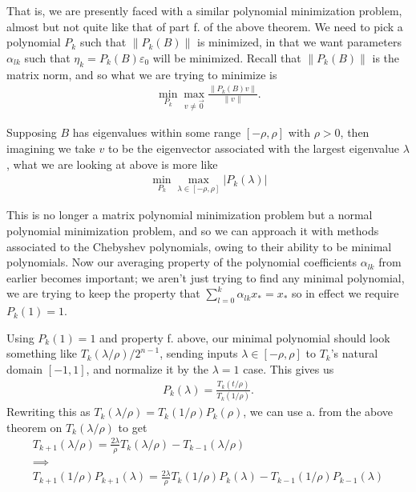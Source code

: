 \documentclass[11pt]{article}
\begin{document}
That is, we are presently faced with a similar polynomial minimization problem, almost but not quite like that of part f. of the above theorem. We need to pick a polynomial $P_k$ such that $\lVert P_k(B) \rVert$ is minimized, in that we want parameters $\alpha_{lk}$ such that $\eta_k = P_k(B) \varepsilon_0$ will be minimized. Recall that $\lVert P_k(B) \rVert$ is the matrix norm, and so what we are trying to minimize is \begin{gather*}
\min_{P_k} \max_{v \neq \vec 0} \frac{\lVert P_k(B) v \rVert }{\lVert v \rVert}.
\end{gather*}

Supposing $B$ has eigenvalues within some range $[-\rho,\rho]$ with $\rho > 0$, then imagining we take $v$ to be the eigenvector associated with the largest eigenvalue $\lambda$, what we are looking at above is more like \begin{gather*}
\min_{P_k} \max_{\lambda \in [-\rho,\rho]} \lvert P_k(\lambda) \rvert
\end{gather*}

This is no longer a matrix polynomial minimization problem but a normal polynomial minimization problem, and so we can approach it with methods associated to the Chebyshev polynomials, owing to their ability to be minimal polynomials. Now our averaging property of the polynomial coefficients $\alpha_{lk}$ from earlier becomes important; we aren't just trying to find any minimal polynomial, we are trying to keep the property that $\sum_{l=0}^k \alpha_{lk} x_* = x_*$ so in effect we require $P_k(1) = 1$.

Using $P_k(1)=1$ and property f. above, our minimal polynomial should look something like $T_k(\lambda/\rho)/2^{n-1}$, sending inputs $\lambda \in [-\rho, \rho]$ to $T_k$'s natural domain $[-1,1]$, and normalize it by the $\lambda = 1$ case. This gives us \begin{gather*}
P_k(\lambda) = \frac{T_k(t/\rho)}{T_k(1/\rho)}.
\end{gather*}
Rewriting this as $T_k(\lambda/\rho) = T_k(1/\rho) P_k(\rho)$, we can use a. from the above theorem on $T_k(\lambda/\rho)$ to get \begin{gather*}
T_{k+1}(\lambda/\rho) = \frac{2\lambda}{\rho} T_k(\lambda/\rho) - T_{k-1}(\lambda/\rho) \\
\implies \\
T_{k+1}(1/\rho) P_{k+1}(\lambda) = \frac{2\lambda}{\rho} T_k(1/\rho) P_k(\lambda) - T_{k-1}(1/\rho) P_{k-1} (\lambda)
\end{gather*}
\end{document}
